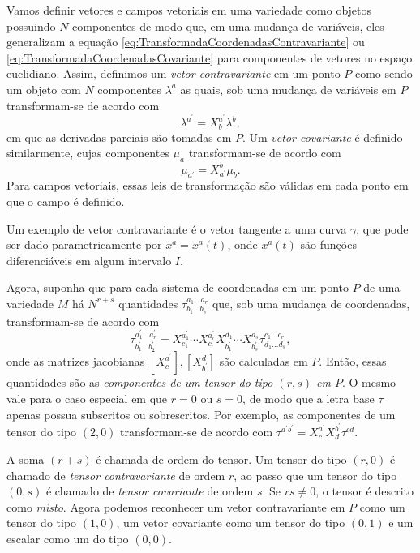 Vamos definir vetores e campos vetoriais em uma variedade como objetos possuindo $N$ componentes de modo que, em uma mudança de variáveis, eles generalizam a equação \eqref{eq:TransformadaCoordenadasContravariante} ou \eqref{eq:TransformadaCoordenadasCovariante} para componentes de vetores no espaço euclidiano. Assim, definimos um \textit{vetor contravariante} em um ponto $P$ como sendo um objeto com $N$ componentes $\lambda^a$ as quais, sob uma mudança de variáveis em $P$ transformam-se de acordo com
\begin{equation}\label{eq:TransformadaCoordenadasContraVariedade}
	\boxed{
		\lambda^{a^\prime} = X^{a^\prime}_b\lambda^b ,
	}
\end{equation}
em que as derivadas parciais são tomadas em $P$. Um \textit{vetor covariante} é definido similarmente, cujas componentes $\mu_a$ transformam-se de acordo com
\begin{equation}
	\boxed{
		\mu_{a^\prime}=X^b_{a^\prime}\mu_b .
	}
\end{equation}
 Para campos vetoriais, essas leis de transformação são válidas em cada ponto em que o campo é definido.

 Um exemplo de vetor contravariante é o vetor tangente a uma curva $\gamma$, que pode ser dado parametricamente por $x^a=x^a(t)$, onde $x^a(t)$ são funções diferenciáveis em algum intervalo $I$. 

Agora, suponha que para cada sistema de coordenadas em um ponto $P$ de uma variedade $M$ há $N^{r+s}$ quantidades $\tau^{a_1\ldots a_r}_{b_1\ldots b_s}$ que, sob uma mudança de coordenadas, transformam-se de acordo com
\begin{equation}\label{eq:TransformacaoCoordenadaTensor}
	\boxed{
		\tau_{b_{1}^{\prime} \ldots b_{s}^{\prime}}^{a_{1}^{\prime} \ldots a_{r}^{\prime}}=X_{c_{1}}^{a_{1}^{\prime}} \cdots X_{c_{r}}^{a_{r}^{\prime}} X_{b_{1}^{\prime}}^{d_{1}} \cdots X_{b_{s}^{\prime}}^{d_{s}} \tau_{d_{1} \ldots d_{s}}^{c_{1} \ldots c_{r}}   ,
	}
\end{equation}
onde as matrizes jacobianas $[X^{a^\prime}_c],[X^d_{b^\prime}]$ são calculadas em $P$. Então, essas quantidades são as \textit{componentes de um tensor do tipo $(r,s)$ em $P$}. O mesmo vale para o caso especial em que $r=0$ ou $s=0$, de modo que a letra base $\tau$ apenas possua subscritos ou sobrescritos. Por exemplo, as componentes de um tensor do tipo $(2,0)$ transformam-se de acordo com $\tau^{a^{\prime} b^{\prime}}=X_{c}^{a^{\prime}} X_{d}^{b^{\prime}} \tau^{c d}$.

A soma $(r+s)$ é chamada de ordem do tensor. Um tensor do tipo $(r,0)$ é chamado de \textit{tensor contravariante} de ordem $r$, ao passo que um tensor do tipo $(0,s)$ é chamado de \textit{tensor covariante} de ordem $s$. Se $rs\neq0$, o tensor é descrito como \textit{misto}. Agora podemos reconhecer um vetor contravariante em $P$ como um tensor do tipo $(1,0)$, um vetor covariante como um tensor do tipo $(0,1)$ e um escalar como um  do tipo $(0,0)$.


